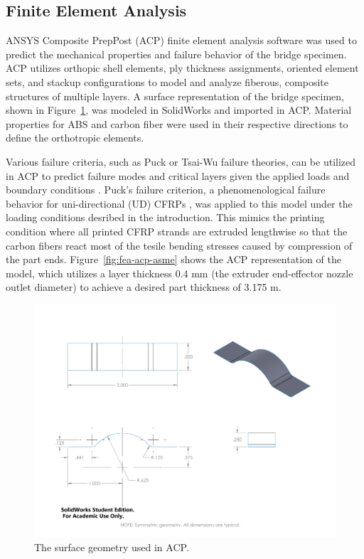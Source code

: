
\subsection*{Finite Element Analysis}

ANSYS Composite PrepPost (ACP) finite element analysis software was used to predict the mechanical properties and failure behavior of the bridge specimen. ACP utilizes orthopic shell elements, ply thickness assignments, oriented element sets, and stackup configurations to model and analyze fiberous, composite structures of multiple layers. A surface representation of the bridge specimen, shown in Figure~\ref{fig:fea-bridge-speciment}, was modeled in SolidWorks and imported in ACP. Material properties for ABS and carbon fiber were used in their respective directions to define the orthotropic elements.

Various failure criteria, such as Puck or Tsai-Wu failure theories, can be utilized in ACP to predict failure modes and critical layers given the applied loads and boundary conditions \cite{ACP-manual}. Puck's failure criterion, a phenomenological failure behavior for uni-directional (UD) CFRPs \cite{Puck-Stuttgard,Puck-NASA}, was applied to this model under the loading conditions desribed in the introduction. This mimics the printing condition where all printed CFRP strands are extruded lengthwise so that the carbon fibers react most of the tesile bending stresses caused by compression of the part ends. Figure~\ref{fig:fea-acp-asme} shows the ACP representation of the model, which utilizes a layer thickness 0.4 mm (the extruder end-effector nozzle outlet diameter) to achieve a desired part thickness of 3.175 m.

\begin{figure}[htp]
\centering
\includegraphics[width=0.8\linewidth]{./figures/fea/fea-surface-geometry}
\caption{The surface geometry used in ACP.}
\label{fig:fea-bridge-speciment}
\end{figure}

